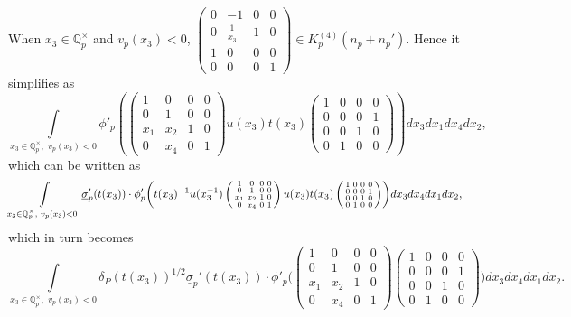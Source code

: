 \documentclass[11pt]{amsart}
\newcommand{\mirp}[1]{K_p^{(4)}(#1)}
\begin{document}
When $x_3 \in \mathbb{Q}_p^\times $ and $v_p(x_3) < 0 $, 
$
	\left(\begin{smallmatrix}
		0 & -1 & 0 & 0 \\
		0 & \frac{1}{x_{3}} & 1 & 0 \\
		1 & 0 & 0 & 0 \\
		0 & 0 & 0 & 1
	\end{smallmatrix}\right) \in \mirp{n_p + n_p'}.
$
Hence it simplifies as
$$%
	\int\limits_{x_3 \in \mathbb{Q}_p^\times,\,\, v_p(x_3)< 0} \phi'_p \left( \left(\begin{smallmatrix}
		1 & 0 & 0 & 0 \\
		0 & 1 & 0 & 0 \\
		x_{1} & x_{2} & 1 & 0 \\
		0 & x_{4} & 0 & 1
	\end{smallmatrix}\right) u(x_3) t(x_3) \left(\begin{smallmatrix}
		1 & 0 & 0 & 0 \\
		0 & 0 & 0 & 1 \\
		0 & 0 & 1 & 0 \\
		0 & 1 & 0 & 0
	\end{smallmatrix}\right)\right) dx_3 dx_1 dx_4 dx_2,
$$
which can be written as
$$
\int\limits_{x_3 \in \mathbb{Q}_p^\times,\,\, v_p(x_3)< 0}  \underline{\sigma}_p'(t(x_3)) \cdot \phi'_p \biggl( t(x_3)^{-1} u(x_3^{-1}) \left(\begin{smallmatrix}
		1 & 0 & 0 & 0 \\
		0 & 1 & 0 & 0 \\
		x_{1} & x_{2} & 1 & 0 \\
		0 & x_{4} & 0 & 1
	\end{smallmatrix}\right) \\ u(x_3) t(x_3) \left(\begin{smallmatrix}
		1 & 0 & 0 & 0 \\
		0 & 0 & 0 & 1 \\
		0 & 0 & 1 & 0 \\
		0 & 1 & 0 & 0
	\end{smallmatrix}\right) \biggr)  dx_3 dx_4 dx_1 dx_2,
$$
which in turn becomes
$$	
 \int\limits_{x_3 \in \mathbb{Q}_p^\times,\,\, v_p(x_3) < 0}  \delta_P(t(x_3))^{1/2}\underline{\sigma}_p'(t(x_3)) \cdot \phi'_p \biggl( \left(\begin{smallmatrix}
		1 & 0 & 0 & 0 \\
		0 & 1 & 0 & 0 \\
		x_{1} & x_{2} & 1 & 0 \\
		0 & x_{4} & 0 & 1
	\end{smallmatrix}\right) 
	\left(\begin{smallmatrix}
		1 & 0 & 0 & 0 \\
		0 & 0 & 0 & 1 \\
		0 & 0 & 1 & 0 \\
		0 & 1 & 0 & 0
	\end{smallmatrix}\right) \biggr)  dx_3 dx_4 dx_1 dx_2.
$$%
\end{document}
